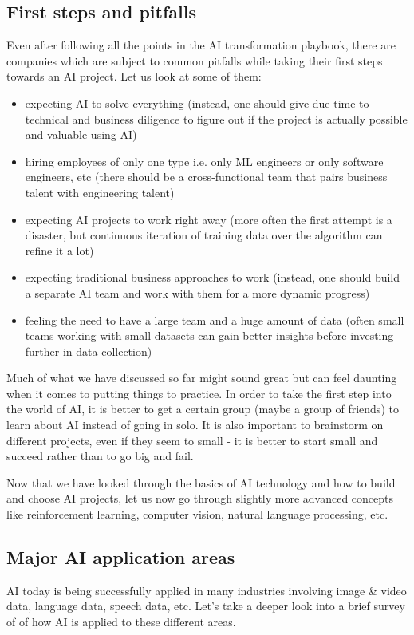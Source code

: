 \documentclass{article}[a4paper,12pt]
\theoremstyle{definition}
\begin{document}
\subsection{First steps and pitfalls}
Even after following all the points in the AI transformation playbook, there are companies which are subject to common pitfalls while taking their first steps towards an AI project.  Let us look at some of them:
\begin{itemize}
	\item expecting AI to solve everything (instead, one should give due time to technical and business diligence to figure out if the project is actually possible and valuable using AI)
	\item hiring employees of only one type i.e. only ML engineers or only software engineers, etc (there should be a cross-functional team that pairs business talent with engineering talent)
	\item expecting AI projects to work right away (more often the first attempt is a disaster, but continuous iteration of training data over the algorithm can refine it a lot)
	\item expecting traditional business approaches to work (instead, one should build a separate AI team and work with them for a more dynamic progress)
	\item feeling the need to have a large team and a huge amount of data (often small teams working with small datasets can gain better insights before investing further in data collection)
\end{itemize}
Much of what we have discussed so far might sound great but can feel daunting when it comes to putting things to practice. In order to take the first step into the world of AI, it is better to get a certain group (maybe a group of friends) to learn about AI instead of going in solo. It is also important to brainstorm on different projects, even if they seem to small - it is better to start small and succeed rather than to go big and fail.
\vspace{6pt}

Now that we have looked through the basics of AI technology and how to build and choose AI projects, let us now go through slightly more advanced concepts like reinforcement learning, computer vision, natural language processing, etc.
\subsection{Major AI application areas}
AI today is being successfully applied in many industries involving image \& video data, language data, speech data, etc. Let's take a deeper look into a brief survey of of how AI is applied to these different areas.
\end{document}
